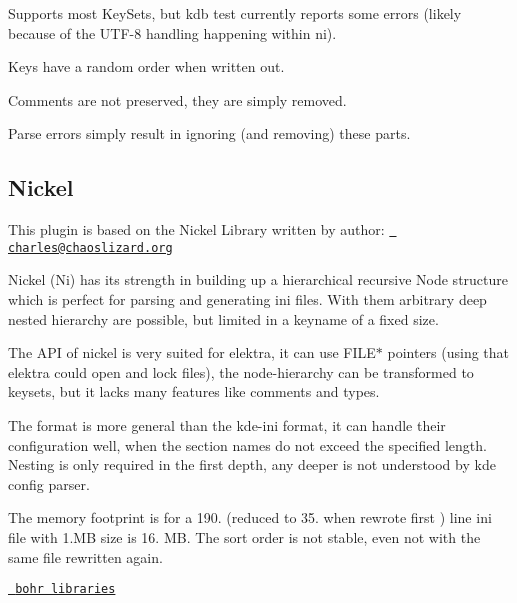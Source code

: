 \begin{DoxyItemize}
\item Supports most Key\+Sets, but {\ttfamily kdb test} currently reports some errors (likely because of the U\+T\+F-\/8 handling happening within ni).
\item Keys have a random order when written out.
\item Comments are not preserved, they are simply removed.
\item Parse errors simply result in ignoring (and removing) these parts.
\end{DoxyItemize}\hypertarget{autotoc_md500_autotoc_md509}{}\subsection{Nickel}\label{autotoc_md500_autotoc_md509}
This plugin is based on the Nickel Library written by author\+: \href{mailto:charles@chaoslizard.org}{\texttt{ charles@chaoslizard.\+org}}

Nickel (Ni) has its strength in building up a hierarchical recursive Node structure which is perfect for parsing and generating ini files. With them arbitrary deep nested hierarchy are possible, but limited in a keyname of a fixed size.

The A\+PI of nickel is very suited for elektra, it can use {\ttfamily F\+I\+L\+E$\ast$} pointers (using that elektra could open and lock files), the node-\/hierarchy can be transformed to keysets, but it lacks many features like comments and types.

The format is more general than the kde-\/ini format, it can handle their configuration well, when the section names do not exceed the specified length. Nesting is only required in the first depth, any deeper is not understood by kde config parser.

The memory footprint is for a 190. (reduced to 35. when rewrote first ) line ini file with 1.\+MB size is 16. MB. The sort order is not stable, even not with the same file rewritten again.

\href{https://lab.burn.capital/chaz-attic/bohr}{\texttt{ bohr libraries}} 
